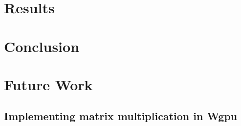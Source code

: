 \documentclass{article}
\begin{document}
\section{Results}

\section{Conclusion}

\section{Future Work}

\begin{appendices}

\appendix

\section{Implementing matrix multiplication in Wgpu}

 \label{sec:wgpu}


\end{appendices}
\end{document}
